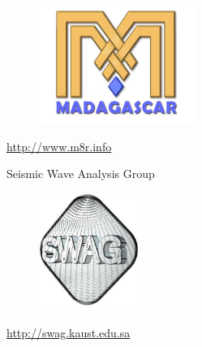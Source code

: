 


\begin{frame}
  \begin{figure}
    \centering                                
    \includegraphics[height=1.5in]{Fig/madagascar}
  \end{figure}
  \begin{center}                                
    \Large{\url{http://www.m8r.info}}
  \end{center}
\end{frame}

\begin{frame}
  \begin{center}                                
    \Large{Seismic Wave Analysis Group}
  \end{center}
    \begin{figure}
    \centering
    \includegraphics[height=1.5in]{Fig/swag}
  \end{figure}
  \begin{center}                                
    \Large{\url{http://swag.kaust.edu.sa}}
  \end{center}
\end{frame}
